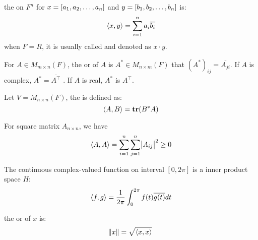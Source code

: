 \begin{definition}
	the  on $F^n$ for $x=\left[ \displaystyle a_1,a_2,\dots,a_n \right]$ and $y=\left[ \displaystyle b_1,b_2,\dots,b_n \right]$ is:
	\begin{equation}
		\left\langle \displaystyle x, y \right\rangle = \sum_{i=1}^n a_i \overline{b_i}		
	\end{equation}
	when $F=R$, it is usually called  and denoted as $x \cdot y$.
\end{definition}

\begin{definition}
	For $A \in M_{m \times n}(F)$, the  or  of $A$ is $A^* \in M_{n \times m}(F)$ that $(A^*)_{ij} = \overline{A_{ji}}$. If $A$ is complex, $A^* = \overline{A^\top}$ . If $A$ is real, $A^*$ is $A^\top$.
\end{definition}

\begin{definition}
    Let $V=M_{n \times n} (F)$, the  is defined as:
    \begin{equation}
        \left\langle \displaystyle A, B \right\rangle = \displaystyle \mathbf{tr}( B^* A )
    \end{equation}
\end{definition}

\begin{theorem}
    For square matrix $A_{n \times n}$, we have 
    \begin{equation}
        \left\langle \displaystyle A, A \right\rangle = \sum_{i=1}^n \sum_{j=1}^n \abs{A_{ij}}^2 \geq 0
    \end{equation}
\end{theorem}


\begin{definition}\label{hinnerproductspace}
	The continuous complex-valued function on interval $[0, 2\pi]$ is a inner product space $H$:
	\begin{equation}
		\left\langle \displaystyle f, g \right\rangle = \frac{1}{2\pi} \int_{0}^{2\pi} f(t) \overline{g(t)} dt
	\end{equation}
\end{definition}


\begin{definition}
	the  or  of $x$ is:
	\begin{equation}
	    \norm{x} = \sqrt{\left\langle \displaystyle x, x \right\rangle}
	\end{equation}
\end{definition}

